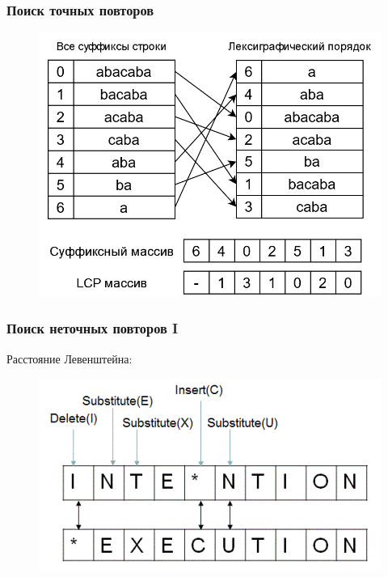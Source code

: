 \documentclass[aspectratio=169]{beamer}
\begin{document}
\begin{frame}\frametitle{Поиск точных повторов}

\begin{figure}
	\includegraphics[scale=0.3]{../diploma/pictures/SA-LCP.png}
\end{figure}

\end{frame}


\begin{frame}\frametitle{Поиск неточных повторов I}
	Расстояние Левенштейна:
	
	\begin{figure}
		\includegraphics[scale=0.45]{../diploma/pictures/edit_dist.png}
	\end{figure}

\end{frame}

\end{document}
